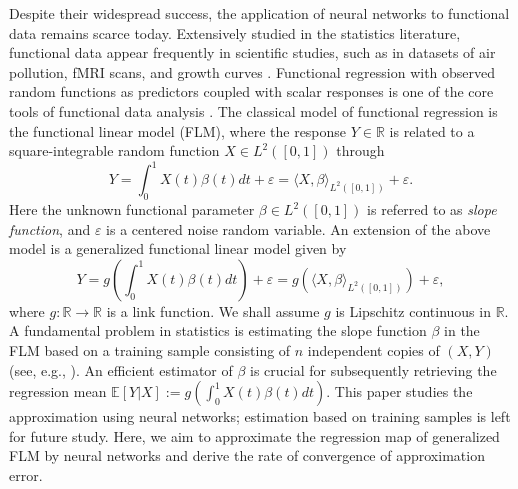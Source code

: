 \documentclass{article}
\def\RR{\mathbb R}
\numberwithin{equation}{section}
\begin{document}
Despite their widespread success, the application of neural networks to functional data remains scarce today. 
Extensively studied in the statistics literature, functional data appear frequently in scientific studies, such as in datasets of air pollution, fMRI scans, and growth curves \citep{yao2005functional, leng2006classification, chiou2012dynamical}.
Functional regression with observed random functions as predictors coupled with scalar responses is one of the core tools of functional data analysis \citep{morris2015functional, wang2016functional}.  
The classical model of
functional regression is the functional linear model (FLM), where the response $Y\in \RR$ is related to a  square-integrable random function $X\in L^2([0,1])$  through
\begin{equation}\label{flm}
    Y= \int_0^1 X(t) \beta(t) dt + \varepsilon  = \langle X, \beta \rangle_{L^2([0,1])} + \varepsilon. 
\end{equation}
Here the unknown functional parameter $\beta \in L^2([0,1])$ is referred to as {\it slope function}, and $\varepsilon$ is a centered noise random variable. 
An extension of the above model is a generalized functional linear model \citep{muller2005generalized} given by 
\begin{equation}\label{gflm}
    Y= g\left(\int_0^1 X(t) \beta(t) dt\right) + \varepsilon =  g\left(\langle X, \beta \rangle_{L^2([0,1])}\right) + \varepsilon,
\end{equation}
where $g:\RR \to \RR$ is a link function. We shall assume $g$ is Lipschitz continuous in $\RR$. 
A fundamental problem in statistics is estimating the slope function $\beta$ in the FLM based on a training sample 
consisting of $n$ independent copies of $(X, Y)$ (see, e.g., \citep{muller2005generalized, chen2011single, yuan2010reproducing}). An efficient estimator of $\beta$ is crucial
for subsequently retrieving
the regression mean 
    $\mathbb{E}[Y|X]:= g\left(\int_0^1 X(t) \beta(t) dt\right)$.
This paper studies the approximation using neural networks; estimation based on training samples is left for future study.  
Here, we aim to approximate the regression map of generalized FLM by neural networks and derive the rate of convergence of approximation error. 
\end{document}
